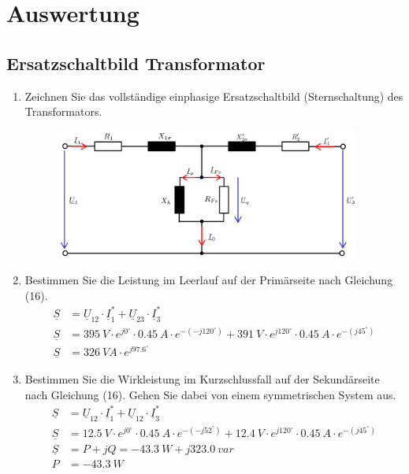 \section{Auswertung}
\subsection{Ersatzschaltbild Transformator}
\begin{enumerate}[label=\alph*)]
  \item Zeichnen Sie das vollständige einphasige Ersatzschaltbild (Sternschaltung) des Transformators. 
    \begin{figure}[h!]
      \begin{center}
        \includegraphics[width=0.95\textwidth]{img/4.1.1.1}
      \end{center}
      \caption{}\label{img:4.1.1.1}
    \end{figure}
    

  \item Bestimmen Sie die Leistung im Leerlauf auf der Primärseite nach Gleichung (16). 
    \begin{align*}
      \underline S &= \underline U_{12} \cdot \underline I_1^* + \underline U_{23}\cdot \underline I_3^*\\
      \underline S &= 395\ V \cdot e^{j0^\circ} \cdot 0.45\ A \cdot e^{-(-j120^\circ)} + 391\ V \cdot e^{j120^\circ}\cdot 0.45\ A \cdot e^{-(j45^\circ)}\\
      \underline S &= 326\ VA\cdot e^{j97.6^\circ}
    \end{align*}

  \item Bestimmen Sie die Wirkleistung im Kurzschlussfall auf der Sekundärseite nach Gleichung (16). Gehen Sie dabei von einem symmetrischen System aus. 
    \begin{align*}
      \underline S &= \underline U_{12} \cdot \underline I_1^* + \underline U_{12}\cdot \underline I_3^*\\
      \underline S &= 12.5\ V \cdot e^{j0^\circ} \cdot 0.45\ A \cdot e^{-(-j52^\circ)} + 12.4\ V \cdot e^{j120^\circ}\cdot 0.45\ A \cdot e^{-(j45^\circ)}\\
      \underline S &= P + jQ = -43.3\ W +j 323.0\ var\\
      P &= -43.3\ W
    \end{align*}


\end{enumerate}
